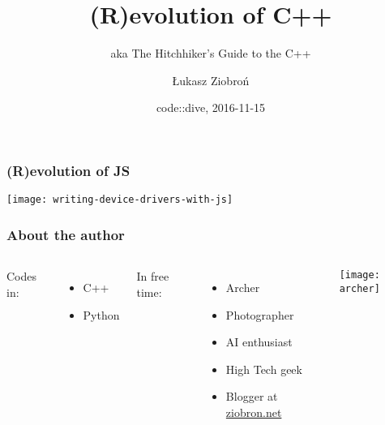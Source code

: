 \author{Łukasz Ziobroń}
\title[Crisis]{(R)evolution of C++}
\date{code::dive, 2016-11-15}
\subject{Computer Science}
\subtitle{aka The Hitchhiker's Guide to the C++}

\begin{frame}
\titlepage
\end{frame}

\begin{frame}
  \frametitle{(R)evolution of JS}
  \centering 
  \texttt{[image: writing-device-drivers-with-js]}
\end{frame}



\begin{frame}
    \frametitle{About the author}
    \begin{columns}
        Codes in:
        \begin{itemize}
            \item C++
            \item Python
        \end{itemize}
        In free time:
        \begin{itemize}%
            \item Archer
            \item Photographer
            \item AI enthusiast
            \item High Tech geek
            \item Blogger at \url{ziobron.net}
        \end{itemize}
        \texttt{[image: archer]}
    \end{columns}
\end{frame}



